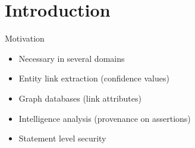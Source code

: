 \section{Introduction}
Motivation
\begin{itemize}
	\item 
Necessary in several domains
\item	Entity link extraction (confidence values)
\item	Graph databases (link attributes)
\item	Intelligence analysis (provenance on assertions)
\item	Statement level security
\end{itemize}

